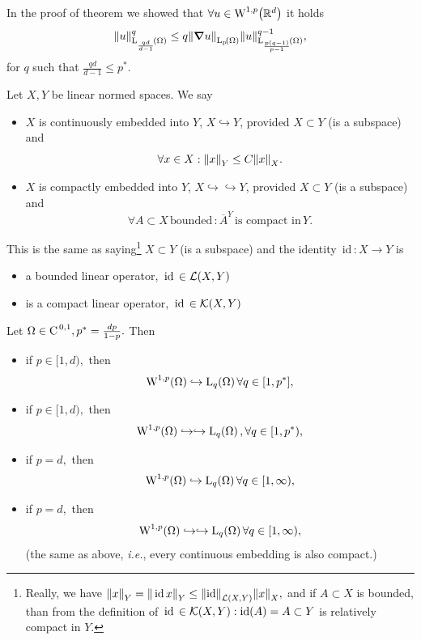 \documentclass{article}
\begin{document}
\begin{remark}
	In the proof of theorem we showed that $\forall u \in \WkpSet[1][p]{\R^d}$ it holds
	\[
		\norm{u}_{\LpSet[\frac{qd}{d-1}]{\Omega}}^q \leq q\norm{\grad u}_{\LpSet{\Omega}} \norm{u}_{\LpSet[\frac{p\qty(q-1)}{p-1}]{\Omega}}^{q-1},
	\]
	for $q$ such that $\frac{qd}{d-1}\leq p^{*}$.
\end{remark}


\begin{definition}
    Let $X,Y$ be linear normed spaces. We say 

    \begin{itemize}
	    \item $X$ is continuously embedded into $Y$, $X \hookrightarrow Y$, provided $X \subset Y$ (is a subspace) and
		    \[
			    \forall x \in X: \norm{x}_Y \leq C \norm{x}_X.
		    \]
	    \item $X$ is compactly embedded into $Y$, $X \hookrightarrow \hookrightarrow Y$, provided $X \subset Y$ (is a subspace) and
		    \[
			    \forall A \subset X \, \text{bounded} \,: \overline{A}^{Y} \, \text{is compact in} \, Y.
		    \]
    \end{itemize}
    This is the same as saying\footnote{Really, we have $\norm{x}_{Y} = \norm{\, \text{id} \,x}_Y \leq \norm{\text{id}}_{\mathcal{L}\qty(X,Y)}\norm{x}_X,$ and if $A \subset X$ is bounded, than from the definition of $\, \text{id} \, \in \mathcal{K}\qty(X,Y): \text{id}(A) = A \subset Y$ is relatively compact in $Y$.} $X \subset Y$ (is a subspace) and the identity $\, \text{id} \,: X \to Y$ is
    \begin{itemize}
	    \item a bounded linear operator, $\, \text{id} \, \in \mathcal{L}\qty(X,Y)$
	    \item is a compact linear operator, $\, \text{id} \, \in \mathcal{K}\qty(X,Y)$
    \end{itemize}
\end{definition}

\begin{theorem}
	Let $\Omega \in \text{C}^{\!\,\, 0,1}, p^{*} = \frac{dp}{1-p}.$ Then

	\begin{itemize}
		\item if $p \in [1,d),$ then
			\[
				\WkpSet[1][p]{\Omega} \hookrightarrow \LpSet[q]{\Omega} \forall q \in [1,p^{*}],
			\]
		\item if $p \in [1,d),$ then
			\[
				\WkpSet[1][p]{\Omega} \hookrightarrow \hookrightarrow \LpSet[q]{\Omega}, \forall q \in [1,p^{*}),
			\]
		\item if $p = d,$ then
			\[
				\WkpSet[1][p]{\Omega} \hookrightarrow \LpSet[q]{\Omega} \forall q \in [1, \infty),
			\]
		\item if $p = d, $ then
			\[
				\WkpSet[1][p]{\Omega} \hookrightarrow \hookrightarrow \LpSet[q]{\Omega} \forall q \in [1,\infty),
			\]
			(the same as above, \textit{i.e.}, every continuous embedding is also compact.)
	\end{itemize}
\end{theorem}
\end{document}
